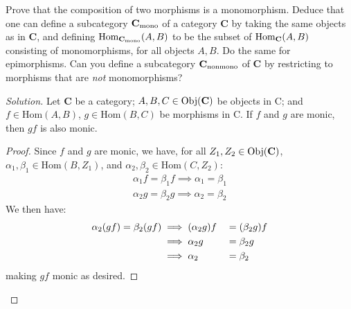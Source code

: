 \documentclass[12pt]{article}
\newenvironment{problem}[2][Problem]{\begin{trivlist}
\item[\hskip \labelsep {\bfseries #1}\hskip \labelsep {\bfseries #2.}]}{\end{trivlist}}
\newcommand{\catname}[1]{\normalfont\textbf{#1}}
\newcommand{\Hom}{\text{Hom}}
\newcommand{\Obj}[1]{\text{Obj}(\catname{C})}
\newenvironment{solution}
  {\renewcommand\qedsymbol{$\blacksquare$}\begin{proof}[Solution]}
{\end{proof}}
\newenvironment{sproof}{
  \renewcommand\qedsymbol{$\square$}
  \begin{proof}
  }{
  \end{proof}
}
\begin{document}
\begin{problem}{4.4}
  Prove that the composition of two morphisms is a monomorphism. 
Deduce that one can define a subcategory $\catname{C}_{\text{mono}}$ of a category \catname{C} by taking the same objects as in \catname{C}, and defining $\Hom_{\catname{C}_\text{mono}}(A,B)$ to be the subset of $\Hom_{\catname{C}}(A,B)$ consisting of monomorphisms, for all objects $A,B$. 
  Do the same for epimorphisms. 
  Can you define a subcategory $\catname{C}_{\text{nonmono}}$ of \catname{C} by restricting to morphisms that are \textit{not} monomorphisms? 
\end{problem}
\begin{solution}
    Let \catname{C} be a category; 
      $A, B, C \in \Obj{C}$ be objects in C; and
      $f\in\Hom(A,B)$,
      $g\in\Hom(B,C)$ be morphisms in C.
      If $f$ and $g$ are monic, then $gf$ is also monic.
      \begin{sproof}
        Since $f$ and $g$ are monic, we have, for all $Z_1, Z_2 \in \Obj{C}$,
        $\alpha_1, \beta_1 \in \Hom(B,Z_1)$, and
        $\alpha_2, \beta_2 \in \Hom(C, Z_2)$:
        \begin{align*}
          \alpha_1f = \beta_1f \implies \alpha_1 = \beta_1\\
          \alpha_2g = \beta_2g \implies \alpha_2 = \beta_2
        \end{align*}
        We then have:
        \begin{alignat*}{3}\relax
          \alpha_2(gf) = \beta_2(gf) &\implies (\alpha_2g)f &&= (\beta_2g)f\\
          &\implies \alpha_2g &&= \beta_2g\\
          &\implies \alpha_2 &&= \beta_2
        \end{alignat*}
        making $gf$ monic as desired.
      \end{sproof}
      

\end{solution}
\end{document}
